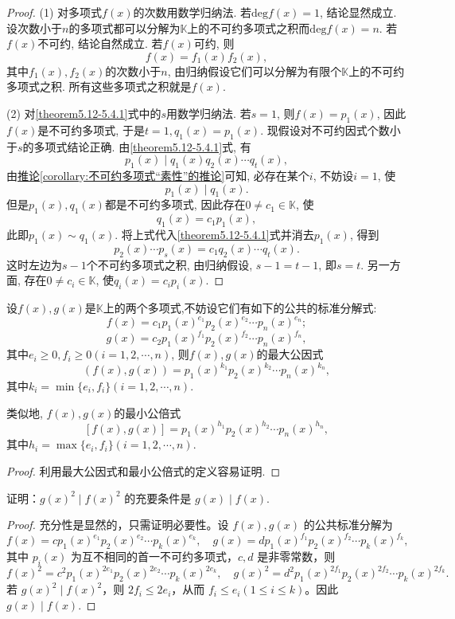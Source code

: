 \documentclass[../../main.tex]{subfiles}%
\begin{document}
\begin{proof}
(1) 对多项式\(f(x)\)的次数用数学归纳法. 若\(\mathrm{deg }f(x)=1\), 结论显然成立. 设次数小于\(n\)的多项式都可以分解为\(\mathbb{K}\)上的不可约多项式之积而\(\mathrm{deg }f(x)=n\). 若\(f(x)\)不可约, 结论自然成立. 若\(f(x)\)可约, 则
\[
f(x)=f_1(x)f_2(x),
\]
其中\(f_1(x),f_2(x)\)的次数小于\(n\), 由归纳假设它们可以分解为有限个\(\mathbb{K}\)上的不可约多项式之积. 所有这些多项式之积就是\(f(x)\).

(2) 对\eqref{theorem5.12-5.4.1}式中的\(s\)用数学归纳法. 若\(s = 1\), 则\(f(x)=p_1(x)\), 因此\(f(x)\)是不可约多项式, 于是\(t = 1, q_1(x)=p_1(x)\). 现假设对不可约因式个数小于\(s\)的多项式结论正确. 由\eqref{theorem5.12-5.4.1}式, 有
\[
p_1(x)\mid q_1(x)q_2(x)\cdots q_t(x),
\]
由\hyperref[corollary:不可约多项式“素性”的推论]{推论\ref{corollary:不可约多项式“素性”的推论}}可知, 必存在某个\(i\), 不妨设\(i = 1\), 使
\[
p_1(x)\mid q_1(x).
\]
但是\(p_1(x),q_1(x)\)都是不可约多项式, 因此存在\(0\neq c_1\in\mathbb{K}\), 使
\[
q_1(x)=c_1p_1(x),
\]
此即\(p_1(x)\sim q_1(x)\). 将上式代入\eqref{theorem5.12-5.4.1}式并消去\(p_1(x)\), 得到
\[
p_2(x)\cdots p_s(x)=c_1q_2(x)\cdots q_t(x).
\]
这时左边为\(s - 1\)个不可约多项式之积, 由归纳假设, \(s - 1=t - 1\), 即\(s = t\). 另一方面, 存在\(0\neq c_i\in\mathbb{K}\), 使\(q_i(x)=c_ip_i(x)\).
\end{proof}

\begin{corollary}\label{corollary:标准分解式具有相同因子的多项式的最大公因式与最小公倍式}
设\(f(x),g(x)\)是\(\mathbb{K}\)上的两个多项式,不妨设它们有如下的公共的标准分解式:
\[
f(x)=c_1p_1(x)^{e_1}p_2(x)^{e_2}\cdots p_n(x)^{e_n};
\]
\[
g(x)=c_2p_1(x)^{f_1}p_2(x)^{f_2}\cdots p_n(x)^{f_n},
\]
其中\(e_i\geqslant  0, f_i\geqslant  0(i = 1,2,\cdots,n)\), 则\(f(x),g(x)\)的最大公因式
\[
(f(x),g(x))=p_1(x)^{k_1}p_2(x)^{k_2}\cdots p_n(x)^{k_n},
\]
其中\(k_i = \min\{e_i,f_i\}(i = 1,2,\cdots,n)\).

类似地, \(f(x),g(x)\)的最小公倍式
\[
[f(x),g(x)]=p_1(x)^{h_1}p_2(x)^{h_2}\cdots p_n(x)^{h_n},
\]
其中\(h_i = \max\{e_i,f_i\}(i = 1,2,\cdots,n)\).
\end{corollary}
\begin{proof}
利用最大公因式和最小公倍式的定义容易证明.
\end{proof}

\begin{proposition}[整除关系在平方下不变]\label{proposition:整除关系在平方下不变}
证明：\(g(x)^2 \mid f(x)^2\) 的充要条件是 \(g(x) \mid f(x)\).
\end{proposition}
\begin{proof}
充分性是显然的，只需证明必要性。设 \(f(x), g(x)\) 的公共标准分解为
\[
f(x) = cp_1(x)^{e_1}p_2(x)^{e_2} \cdots p_k(x)^{e_k}, \quad g(x) = dp_1(x)^{f_1}p_2(x)^{f_2} \cdots p_k(x)^{f_k},
\]
其中 \(p_i(x)\) 为互不相同的首一不可约多项式，\(c, d\) 是非零常数，则
\[
f(x)^2 = c^2 p_1(x)^{2e_1}p_2(x)^{2e_2} \cdots p_k(x)^{2e_k}, \quad g(x)^2 = d^2 p_1(x)^{2f_1}p_2(x)^{2f_2} \cdots p_k(x)^{2f_k}.
\]
若 \(g(x)^2 \mid f(x)^2\)，则 \(2f_i \leqslant  2e_i\)，从而 \(f_i \leqslant  e_i (1 \leqslant  i \leqslant  k)\)。因此 \(g(x) \mid f(x)\).
\end{proof}
\end{document}
